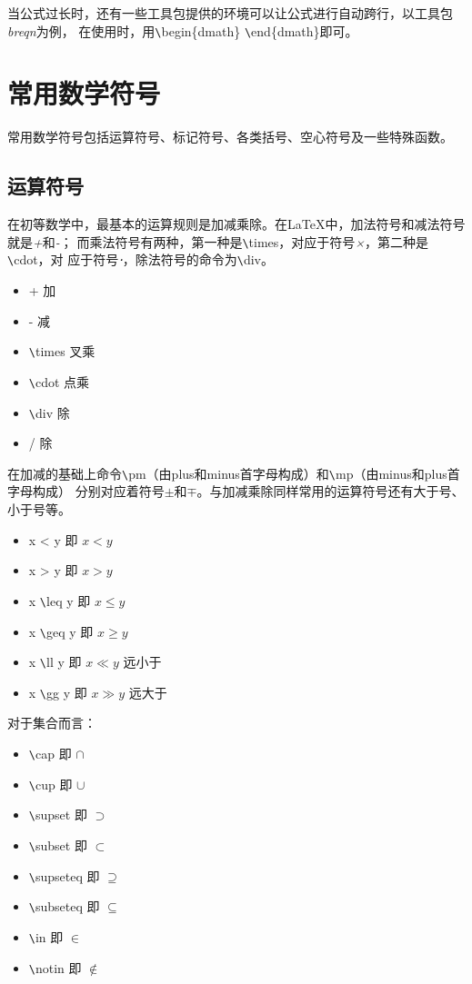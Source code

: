 当公式过长时，还有一些工具包提供的环境可以让公式进行自动跨行，以工具包\emph{breqn}为例，
在使用时，用\verb|\|begin\{dmath\} \verb|\|end\{dmath\}即可。

\section{常用数学符号}
常用数学符号包括运算符号、标记符号、各类括号、空心符号及一些特殊函数。

\subsection{运算符号}
在初等数学中，最基本的运算规则是加减乘除。在LaTeX中，加法符号和减法符号就是\emph{+}和\emph{-}；
而乘法符号有两种，第一种是\verb|\|times，对应于符号\emph{×}，第二种是\verb|\|cdot，对
应于符号\emph{⋅}，除法符号的命令为\verb|\|div。

\begin{itemize}
    \item + 加
    \item - 减
    \item \verb|\|times 叉乘
    \item \verb|\|cdot 点乘
    \item \verb|\|div 除
    \item / 除
\end{itemize}

在加减的基础上命令\verb|\|pm（由plus和minus首字母构成）和\verb|\|mp（由minus和plus首字母构成）
分别对应着符号\emph{$\pm$}和\emph{$\mp$}。与加减乘除同样常用的运算符号还有大于号、小于号等。

\begin{itemize}
    \item x < y 即 $x < y$
    \item x > y 即 $x > y$
    \item x \verb|\|leq y 即 $x \leq y$
    \item x \verb|\|geq y 即 $x \geq y$
    \item x \verb|\|ll y 即 $x \ll y$ 远小于
    \item x \verb|\|gg y 即 $x \gg y$ 远大于
\end{itemize}

对于集合而言：
\begin{itemize}
    \item \verb|\|cap 即 $\cap$
    \item \verb|\|cup 即 $\cup$
    \item \verb|\|supset 即 $\supset$
    \item \verb|\|subset 即 $\subset$
    \item \verb|\|supseteq 即 $\supseteq$
    \item \verb|\|subseteq 即 $\subseteq$
    \item \verb|\|in 即 $\in$
    \item \verb|\|notin 即 $\notin$
\end{itemize}

